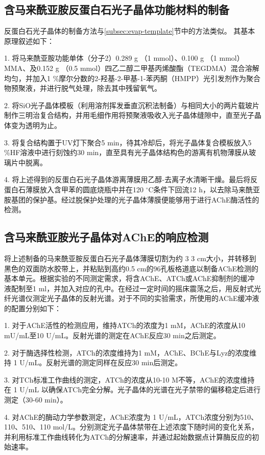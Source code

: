 \subsection{含马来酰亚胺反蛋白石光子晶体功能材料的制备}
反蛋白石光子晶体的制备方法与\ref{subsec:evap-template}节中的方法类似。
其基本原理叙述如下：

1. 将马来酰亚胺功能单体（分子2）0.289 g （1 mmol）、0.100 g （1 mmol）MMA、及0.152 g （0.5 mmol）四乙二醇二甲基丙烯酸酯（TEGDMA）混合溶解均匀，并加入1 \%摩尔分数的2-羟基-2-甲基-1-苯丙酮（HMPP）光引发剂作为聚合物预聚液，并进行脱气处理，除去其中残留氧气。

2. 将SiO光子晶体模板（利用溶剂挥发垂直沉积法制备）与相同大小的两片载玻片制作三明治复合结构，并用毛细作用将预聚液吸收入光子晶体缝隙中，直至光子晶体变为透明为止。

3. 将复合结构置于UV灯下聚合5 min，待其冷却后，将光子晶体复合模板放入5 \%HF溶液中进行刻蚀约30 min，直至具有光子晶体结构色的游离有机物薄膜从玻璃片中脱离。

4. 将上述得到的反蛋白石光子晶体游离薄膜用乙醇-去离子水清晰干燥。最后将反蛋白石薄膜放入含甲苯的圆底烧瓶中并在120 $^{\circ}$C条件下回流12 h，以去除马来酰亚胺基团的保护基。经过脱保护处理的光子晶体薄膜便能够用于进行AChE酶活性的检测。

\subsection{含马来酰亚胺光子晶体对AChE的响应检测}
将上述制备的马来酰亚胺反蛋白石光子晶体薄膜切割为约 3 \text{$\times$} 3 cm大小，并转移到黑色的双面防水胶带上，并粘贴到高约0.5 cm的96孔板格道底以制备AChE检测的基本单元。根据实验的不同测定需求，将含AChE、ATCh或AChE抑制剂的缓冲液配制至1 ml，并加入对应的孔中。在经过一定时间的摇床震荡之后，用反射式光纤光谱仪测定光子晶体的反射光谱。对于不同的实验需求，所使用的AChE缓冲液的配置分别如下：

1. 对于AChE活性的检测应用，维持ATCh的浓度为1 mM，AChE的浓度从10 mU/mL至10 U/mL。反射光谱的测定在AChE反应30 min之后测定。

2. 对于酶选择性检测，ATCh的浓度维持为1 mM，AChE、BChE与Lyz的浓度维持 1 U/mL。反射光谱的测定同样在反应30 min后测定。

3. 对TCh标准工作曲线的测定，ATCh的浓度从10-10 M不等，AChE的浓度维持在 1 U/mL 以确保ATCh完全分解。光子晶体的光谱在光子禁带的偏移稳定后进行测定（30-60 min）。

4. 对AChE的酶动力学参数测定，AChE浓度为 1 U/mL，ATCh浓度分别为5\text{$\times$}10、1\text{$\times$}10、5\text{$\times$}10、1\text{$\times$}10 mol/L。分别测定光子晶体禁带在上述浓度下随时间的变化关系，并利用标准工作曲线转化为ATCh的分解速率，并通过起始数据点计算酶反应的初始速率。

